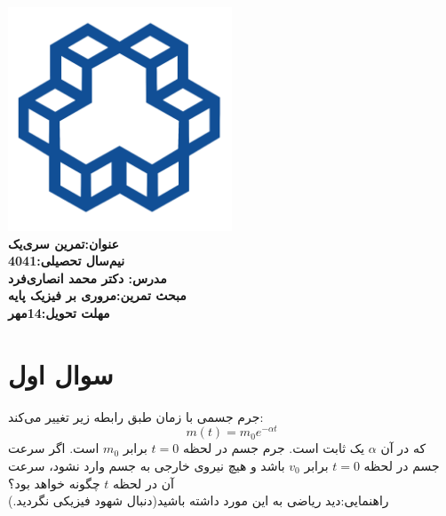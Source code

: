 \documentclass[a4paper,16pt]{article}
\begin{document}
	
	\thispagestyle{empty}
	\begin{center}
		\includegraphics[width=0.5\textwidth]{../../images/image-E_1/image-1.png} \\[10pt] 
		
		\textbf{\LARGE عنوان:تمرین سری‌یک}\\[20pt]
		
		\textbf{\LARGE نیم‌سال تحصیلی:4041 }\\[10pt]
		
		\textbf{\Large مدرس: دکتر محمد انصاری‌فرد}\\[10pt]
		
		\textbf{\Large مبحث تمرین:مروری بر فیزیک پایه   }\\[10pt]
		
		\textbf{\Large مهلت تحویل:14مهر }
	\end{center}
	
	\newpage
	
	\tableofcontents
	\newpage
	
	
	\section{سوال اول}
	جرم جسمی با زمان طبق رابطه زیر تغییر می‌کند:
	\[
	m(t) = m_0 e^{-\alpha t}
	\]
	که در آن $\alpha$ یک ثابت است. جرم جسم در لحظه $t=0$ برابر $m_0$ است.  
	اگر سرعت جسم در لحظه $t=0$ برابر $v_0$ باشد و هیچ نیروی خارجی به جسم وارد نشود،  
	سرعت آن در لحظه $t$ چگونه خواهد بود؟
	\\
	راهنمایی:دید ‌ریاضی به این مورد داشته باشید(دنبال شهود فیزیکی نگردید.)
\end{document}

